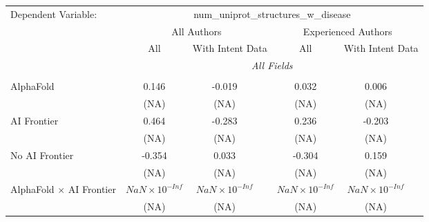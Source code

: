 \begingroup
\centering
\begin{tabular}{lcccccc}
   \tabularnewline \midrule \midrule
   Dependent Variable: & \multicolumn{6}{c}{num\_uniprot\_structures\_w\_disease}\\
 & \multicolumn{3}{c}{All Authors} & \multicolumn{3}{c}{Experienced Authors} \\
\cmidrule(lr){2-4} \cmidrule(lr){5-7}
 & \multicolumn{1}{c}{All} & \multicolumn{2}{c}{With Intent Data} & \multicolumn{1}{c}{All} & \multicolumn{2}{c}{With Intent Data} \\
\cmidrule(lr){2-2} \cmidrule(lr){3-4} \cmidrule(lr){5-5} \cmidrule(lr){6-7}
 & \multicolumn{6}{c}{\textit{All Fields}} \\ \\
   AlphaFold                                                                  & 0.146                  & -0.019                 &                        & 0.032                  & 0.006                  &   \\   
                                                                              & (NA)                   & (NA)                   &                        & (NA)                   & (NA)                   &   \\   
   AI Frontier                                                                & 0.464                  & -0.283                 &                        & 0.236                  & -0.203                 &   \\   
                                                                              & (NA)                   & (NA)                   &                        & (NA)                   & (NA)                   &   \\   
   No AI Frontier                                                             & -0.354                 & 0.033                  &                        & -0.304                 & 0.159                  &   \\   
                                                                              & (NA)                   & (NA)                   &                        & (NA)                   & (NA)                   &   \\   
   AlphaFold $\times$ AI Frontier                                             & $NaN\times 10^{-Inf}$  & $NaN\times 10^{-Inf}$  &                        & $NaN\times 10^{-Inf}$  & $NaN\times 10^{-Inf}$  &   \\   
                                                                              & (NA)                   & (NA)                   &                        & (NA)                   & (NA)                   &   \\   

\end{tabular}
